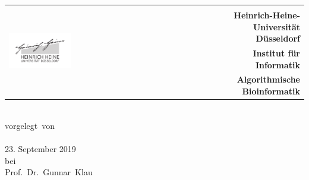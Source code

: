 \documentclass[12pt,a4paper,DIV12,oneside,chapterprefix,enabledeprecatedfontcommands]{book}
\makeatletter
\newcommand{\anfanglinks}{%
    \@openrightfalse
  }
\newcommand{\anfangrechts}{%
    \cleardoublepage
    \@openrighttrue
}
\makeatother
\begin{document}
\onehalfspacing
\frontmatter
{}
\begin{center}
\begin{tabularx}{0.97\textwidth}{lR}
 & \\
& \bf\large
Heinrich-Heine-Universit\"at D\"usseldorf\\
	 & \bf\large
Institut f\"ur Informatik\\
	 & \bf Algorithmische Bioinformatik
\end{tabularx}
\end{center}

\vfill
\begin{center}
\hspace*{-1cm}
\vspace*{1cm}\huge~\ ~\Typ\\
    \vspace{1cm}\normalsize vorgelegt\ von\\
    \large\Autor\\ 23. September 2019 \\%
    \vspace{1cm}\normalsize bei\\ \large Prof.\ Dr.\ Gunnar\ Klau \\
\end{center}
\cleardoublepage
\anfanglinks
{}

\printindex
%

\cleardoublepage
\listoffigures

\tableofcontents
\cleardoublepage

\anfangrechts
\mainmatter
\cleardoublepage

\backmatter
%
\renewcommand*{\bibname}{References}


%





\cleardoublepage

\end{document}
